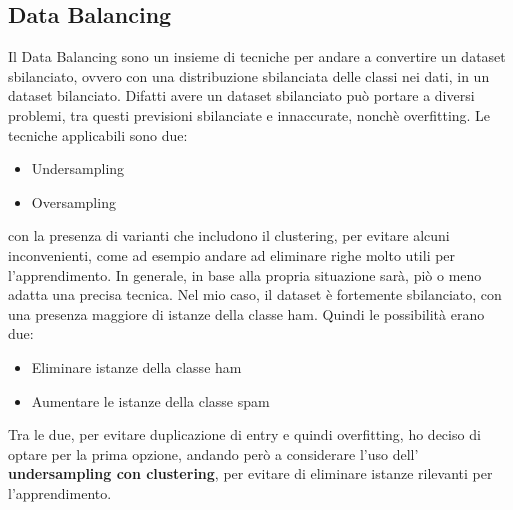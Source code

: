 \documentclass[]{article}
\begin{document}
        \subsection{Data Balancing}
            Il Data Balancing sono un insieme di tecniche per andare a convertire un dataset sbilanciato, ovvero con una distribuzione sbilanciata delle classi nei dati, in un dataset bilanciato. Difatti avere un dataset sbilanciato può portare a diversi problemi, tra questi previsioni sbilanciate e innaccurate, nonchè overfitting.
            Le tecniche applicabili sono due:
            \begin{itemize}
                \item Undersampling
                \item Oversampling
            \end{itemize}
            con la presenza di varianti che includono il clustering, per evitare alcuni inconvenienti, come ad esempio andare ad eliminare righe molto utili per l'apprendimento. In generale, in base alla propria situazione sarà, piò o meno adatta una precisa tecnica.
            Nel mio caso, il dataset è fortemente sbilanciato, con una presenza maggiore di istanze della classe ham. Quindi le possibilità erano due:
            \begin{itemize}
                \item Eliminare istanze della classe ham
                \item Aumentare le istanze della classe spam
            \end{itemize}
            Tra le due, per evitare duplicazione di entry e quindi overfitting, ho deciso di optare per la prima opzione, andando però a considerare l'uso dell' \textbf{undersampling con clustering}, per evitare di eliminare istanze rilevanti per l'apprendimento.













\end{document}
